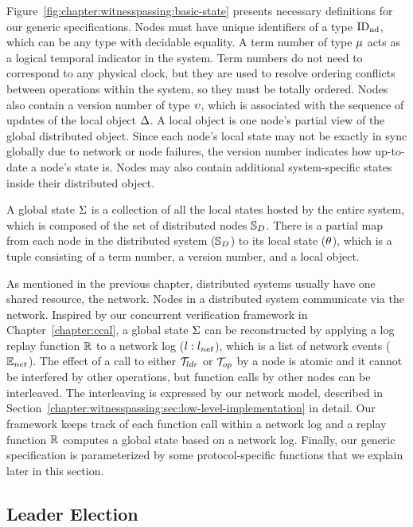 Figure~\ref{fig:chapter:witnesspassing:basic-state} presents  necessary definitions for our generic specifications.
Nodes must have unique identifiers of a type $\mathrm{ID_{nd}}$, which can be any type with decidable equality.
A term number of type $\mu$ acts as a logical temporal indicator in the system.
Term numbers do not need to correspond to any physical clock,
but they are used to resolve ordering conflicts between operations within the system,
so they must be totally ordered.
Nodes also contain a version number of type $\upsilon$, which is associated with the sequence of updates
of the local object $\Delta$.
A local object is one node's partial view of the global distributed object.
Since each node's local state may not be exactly in sync globally due to network or
node failures, the version number indicates how up-to-date a node's state is.
Nodes may also contain additional system-specific states inside their distributed object.

A global state $\Sigma$ is a collection of all the local states hosted by the
entire system, which is composed of the set of distributed nodes $\mathbb{S}_{D}$.
There is a partial map from each node in the distributed system ($\mathbb{S}_{D}$)
to its local state ($\theta$), which is a tuple consisting of a term number,
a version number, and a local object.

As mentioned in the previous chapter, 
distributed systems usually have one shared resource, the network. 
Nodes in a distributed system communicate via the network. 
Inspired by our concurrent verification framework in Chapter~\ref{chapter:ccal},
a global state $\Sigma$ can be reconstructed by
applying a log replay function $\mathbb{R}$ to a
network log ($l : {l_{net}}$), which is a list of network events (${\mathbb{E}_{net}}$).
The effect of a call to either $\mathcal{T}_{ldr}$ or $\mathcal{T}_{op}$ by a node is atomic 
and it cannot be interfered by other operations, 
but function calls by other nodes can be interleaved.
The interleaving is expressed by our network model, described in Section~\ref{chapter:witnesspassing:sec:low-level-implementation} in detail.
Our framework keeps track of each function call
within a network log and a replay function $\mathbb{R}$ computes a
global state based on a network log.
Finally, our generic specification is parameterized by some protocol-specific
functions that we explain later in this section.


\subsection{Leader Election}
\label{chapter:witnesspassing:subsec:leader-election}

